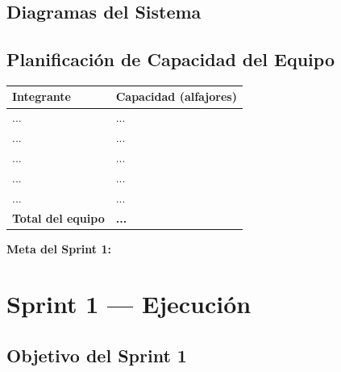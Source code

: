 \documentclass[12pt,a4paper]{article}
\begin{document}

\subsection{Diagramas del Sistema}


\subsection{Planificación de Capacidad del Equipo}


\begin{longtable}{|p{4cm}|p{3cm}|}
\hline
\textbf{Integrante} & \textbf{Capacidad (alfajores)} \\
\hline
... & ... \\
... & ... \\
... & ... \\
... & ... \\
... & ... \\
\hline
\textbf{Total del equipo} & \textbf{...} \\
\hline
\end{longtable}

\textbf{Meta del Sprint 1:} %

\newpage

\section{Sprint 1 — Ejecución}

\subsection{Objetivo del Sprint 1}
\end{document}
